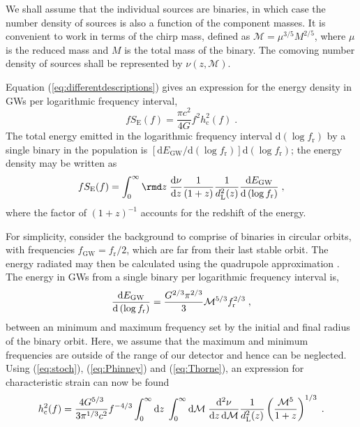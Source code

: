 We shall assume that the individual sources are binaries, in which case the number density of sources is also a function of the component masses. It is convenient to work in terms of the chirp mass, defined as ${\mathcal{M}}=\mu^{3/5}M^{2/5}$, where $\mu$ is the reduced mass and $M$ is the total mass of the binary. The comoving number density of sources shall be represented by $\nu(z, \mathcal{M})$.

Equation (\ref{eq:differentdescriptions}) gives an expression for the energy density in GWs per logarithmic frequency interval,
\begin{equation}\label{eq:stoch}
fS_{\mathrm{E}}(f)=\frac{\pi c^{2}}{4G}f^{2}h_\mathrm{c}^{2}(f) \; .
\end{equation}
The total energy emitted in the logarithmic frequency interval $\mathrm{d}\left(\log f_{\mathrm{r}}\right)$ by a single binary in the population is $\left[\mathrm{d}E_{\mathrm{GW}}/\mathrm{d}(\log f_{\mathrm{r}})\right]\mathrm{d}(\log f_{\mathrm{r}})$; the energy density may be written as
\begin{equation}\label{eq:Phinney}
fS_{\mathrm{E}}(f) = \int_{0}^{\infty} \rmd z\; \frac{\mathrm{d}\nu}{\mathrm{d}z}\frac{1}{(1+z)}\frac{1}{d_{\mathrm{L}}^{2}(z)}\frac{\mathrm{d}E_{\mathrm{GW}}}{\mathrm{d}\left(\log f_{\mathrm{r}} \right)} \; , \end{equation}
where the factor of $\left( 1+z \right)^{-1}$ accounts for the redshift of the energy.

For simplicity, consider the background to comprise of binaries in circular orbits, with frequencies $f_\mathrm{GW} =f_{\mathrm{r}}/2$, which are far from their last stable orbit. The energy radiated may then be calculated using the quadrupole approximation \citep{petersmathews1963}. The energy in GWs from a single binary per logarithmic frequency interval is, 
\begin{equation}\label{eq:Thorne}
\frac{\mathrm{d}E_{\mathrm{GW}}}{\mathrm{d}\left(\log f_{\mathrm{r}} \right)} = \frac{G^{2/3}\pi^{2/3}}{3}{\cal{M}}^{5/3}f_{\mathrm{r}}^{2/3} \; ,
\end{equation}
between an minimum and maximum frequency set by the initial and final radius of the binary orbit. Here, we assume that the maximum and minimum frequencies are outside of the range of our detector and hence can be neglected. Using (\ref{eq:stoch}), (\ref{eq:Phinney}) and (\ref{eq:Thorne}), an expression for characteristic strain can now be found \citep{SesanaVecchioColancino}
\begin{equation}\label{eq:bigint}
h_\mathrm{c}^{2}(f) = \frac{4G^{5/3}}{3\pi^{1/3}c^{2}}f^{-4/3}\int_{0}^{\infty}\mathrm{d}z\;\int_{0}^{\infty}\mathrm{d}{\cal{M}}\;\frac{\mathrm{d}^{2}\nu}{\mathrm{d}z\,\mathrm{d}{\mathcal{M}}}\frac{1}{d_{\mathrm{L}}^{2}(z)}\left( \frac{{\mathcal{M}}^{5}}{1+z} \right)^{1/3}\; .
\end{equation}

